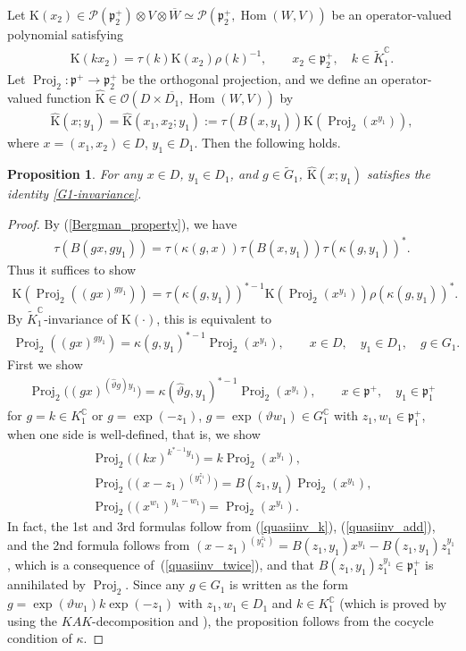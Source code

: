 \documentclass[pdftex]{sigma}
\numberwithin{equation}{section}
\newtheorem{Proposition}[Theorem]{Proposition}
{ \theoremstyle{definition}
\newtheorem{Definition}[Theorem]{Definition}
\newtheorem{Note}[Theorem]{Note}
\newtheorem{Example}[Theorem]{Example}
\newtheorem{Remark}[Theorem]{Remark} }
\newcommand{\BC}{\mathbb{C}}
\newcommand{\fp}{\mathfrak{p}}
\newcommand{\cO}{\mathcal{O}}
\newcommand{\cP}{\mathcal{P}}
\newcommand{\rK}{\mathrm{K}}
\newcommand{\Hom}{\operatorname{Hom}}
\newcommand{\Proj}{\operatorname{Proj}}
\begin{document}
Let $\rK(x_2)\in\cP(\fp^+_2)\otimes V\otimes\overline{W}\simeq\cP(\fp^+_2,\Hom(W,V))$ be an operator-valued polynomial satisfying
\begin{gather}\label{K-invariance}
\rK(kx_2)=\tau(k)\rK(x_2)\rho(k)^{-1}, \qquad x_2\in \fp^+_2,\quad k\in \tilde{K}^\BC_1.
\end{gather}
Let $\Proj_2\colon \fp^+\to\fp^+_2$ be the orthogonal projection, and we define an operator-valued function $\hat{\rK}\in\cO(D\times \overline{D_1}, \Hom(W,V))$ by
\begin{gather}\label{Khat}
\hat{\rK}(x;y_1)=\hat{\rK}(x_1,x_2;y_1):=\tau(B(x,y_1))\rK(\Proj_2(x^{y_1})),
\end{gather}
where $x=(x_1,x_2)\in D$, $y_1\in D_1$. Then the following holds.
\begin{Proposition}\label{kernelfunc}
For any $x\in D$, $y_1\in D_1$, and $g\in\tilde{G}_1$, $\hat{\rK}(x;y_1)$ satisfies the identity \eqref{G1-invariance}.
\end{Proposition}
\begin{proof}
By (\ref{Bergman_property}), we have
\begin{gather*} \tau(B(gx,gy_1))=\tau(\kappa(g,x))\tau(B(x,y_1))\tau(\kappa(g,y_1))^*. \end{gather*}
Thus it suffices to show
\begin{gather*} \rK(\Proj_2((gx)^{gy_1}))=\tau(\kappa(g,y_1))^{*-1}\rK(\Proj_2(x^{y_1}))\rho(\kappa(g,y_1))^*. \end{gather*}
By $\tilde{K}^\BC_1$-invariance of $\rK(\cdot)$, this is equivalent to
\begin{gather*} \Proj_2((gx)^{gy_1})=\kappa(g,y_1)^{*-1}\Proj_2(x^{y_1}), \qquad x\in D,\quad y_1\in D_1,\quad g\in G_1. \end{gather*}
First we show
\begin{gather*} \Proj_2\big((gx)^{(\hat{\vartheta}g)y_1}\big)=\kappa(\hat{\vartheta}g,y_1)^{*-1}\Proj_2(x^{y_1}), \qquad x\in \fp^+,\quad y_1\in \fp^+_1 \end{gather*}
for $g=k\in K_1^\BC$ or $g=\exp(-z_1)$, $g=\exp(\vartheta w_1)\in G_1^\BC$ with $z_1,w_1\in\fp^+_1$,
when one side is well-defined, that is, we show
\begin{gather*}
\Proj_2\big((kx)^{k^{*-1}y_1}\big)=k\Proj_2(x^{y_1}), \\
\Proj_2\big((x-z_1)^{(y_1^{z_1})}\big)=B(z_1,y_1)\Proj_2(x^{y_1}), \\
\Proj_2\big((x^{w_1})^{y_1-w_1}\big)=\Proj_2(x^{y_1}).
\end{gather*}
In fact, the 1st and 3rd formulas follow from (\ref{quasiinv_k}), (\ref{quasiinv_add}),
and the 2nd formula follows from $(x-z_1)^{(y_1^{z_1})}=B(z_1,y_1)x^{y_1}-B(z_1,y_1)z_1^{y_1}$,
which is a consequence of~(\ref{quasiinv_twice}), and that $B(z_1,y_1)z_1^{y_1}\in\fp^+_1$ is annihilated by $\Proj_2$.
Since any $g\in G_1$ is written as the form $g=\exp(\vartheta w_1)k\exp(-z_1)$ with $z_1,w_1\in D_1$ and $k\in K^\BC_1$
(which is proved by using the $KAK$-decomposition and \cite[Part~III, Lemma~III.2.4]{FKKLR}),
the proposition follows from the cocycle condition of $\kappa$.
\end{proof}
\end{document}
